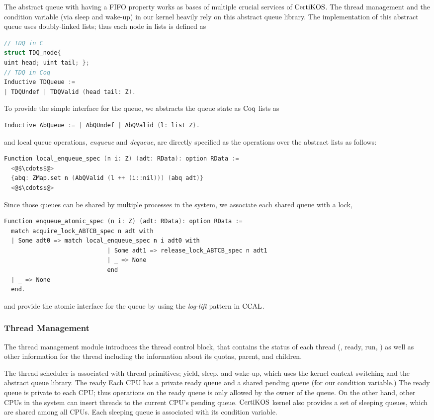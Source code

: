 The abstract queue with having a FIFO property works as bases of multiple crucial services of $\mathrm{CertiKOS}$. 
The thread management and the condition variable (via sleep and wake-up) in our kernel heavily rely on this abstract queue library. 
The implementation of this abstract queue uses 
doubly-linked lists; thus each node in lists is defined as 
\begin{lstlisting}[language = C, multicols=2]
// TDQ in C
struct TDQ_node{
uint head; uint tail; };
// TDQ in Coq
Inductive TDQueue :=
| TDQUndef | TDQValid (head tail: Z).   
\end{lstlisting}
To provide the simple interface for the queue, 
we abstracts the queue state as $\mathrm{Coq}$ lists as
\begin{lstlisting}[language = C]
Inductive AbQueue := | AbQUndef | AbQValid (l: list Z).
\end{lstlisting}
and local queue operations,
 \textit{enqueue} and \textit{dequeue},
are directly specified as the operations over the abstract lists as follows:
\begin{lstlisting}[language = C]
Function local_enqueue_spec (n i: Z) (adt: RData): option RData :=
  <@$\cdots$@>
  {abq: ZMap.set n (AbQValid (l ++ (i::nil))) (abq adt)}
  <@$\cdots$@>
\end{lstlisting}
Since those queues can be shared by multiple processes in the system, 
we associate each shared queue with a lock,
\begin{lstlisting}[language = C]
Function enqueue_atomic_spec (n i: Z) (adt: RData): option RData :=
  match acquire_lock_ABTCB_spec n adt with
  | Some adt0 => match local_enqueue_spec n i adt0 with
                             | Some adt1 => release_lock_ABTCB_spec n adt1
                             | _ => None
                             end
  | _ => None
  end.
\end{lstlisting}
and provide the atomic interface for the queue by using the \textit{log-lift} pattern in $\mathrm{CCAL}$.


\subsubsection{Thread Management}
The thread management module introduces the  thread control block, 
that contains the status of each thread (\ie, ready, run, \etc)
as well as other information for the thread including the information about its quotas, parent, and children.

The thread scheduler is associated with thread primitives; yield, sleep, and wake-up, which uses the kernel context switching and the abstract queue library. 
The ready
Each CPU has a private ready queue and a shared pending queue (for our condition variable.) 
The ready queue is private to each CPU; thus operations on the ready queue is only allowed by the owner of the queue.
On the other hand, other CPUs in the system can insert threads to the current CPU’s pending queue. 
$\mathrm{CertiKOS}$ kernel also provides a set of sleeping queues, which are shared among all CPUs.
Each sleeping queue is associated with its condition variable. 

